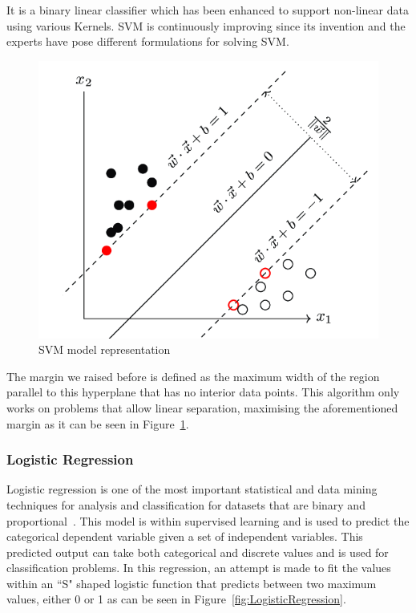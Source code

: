 It is a binary linear classifier which has been enhanced to support non-linear data using various Kernels. SVM is continuously improving since its invention and the experts have pose different formulations for solving SVM. 

\begin{figure}[!htp]
    \centering
    \includegraphics[scale=0.4]{img/detection/SVM.png}
    \caption{SVM model representation}
    \label{fig:SVM}
\end{figure}

The margin we raised before is defined as the maximum width of the region parallel to this hyperplane that has no interior data points. This algorithm only works on problems that allow linear separation, maximising the aforementioned margin as it can be seen in Figure~\ref{fig:SVM}.

\subsubsection{Logistic Regression}
Logistic regression is one of the most important statistical and data mining techniques for analysis and classification for datasets that are binary and proportional~\cite{maalouf2011logistic}. This model is within supervised learning and is used to predict the categorical dependent variable given a set of independent variables. This predicted output can take both categorical and discrete values and is used for classification problems. In this regression, an attempt is made to fit the values within an ``S" shaped logistic function that predicts between two maximum values, either 0 or 1 as can be seen in Figure~\ref{fig:LogisticRegression}.

